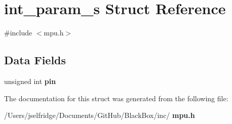 \section{int\+\_\+param\+\_\+s Struct Reference}
\label{structint__param__s}


{\ttfamily \#include $<$mpu.\+h$>$}

\subsection*{Data Fields}
\begin{DoxyCompactItemize}
\item 
unsigned int \textbf{ pin}
\end{DoxyCompactItemize}


The documentation for this struct was generated from the following file\+:\begin{DoxyCompactItemize}
\item 
/\+Users/jselfridge/\+Documents/\+Git\+Hub/\+Black\+Box/inc/\textbf{ mpu.\+h}\end{DoxyCompactItemize}
